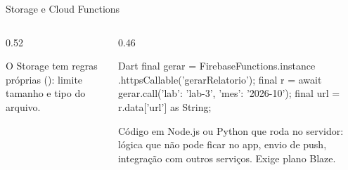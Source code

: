 \documentclass[aspectratio=169,10pt]{beamer}
\begin{document}
\begin{frame}[fragile]{Storage e Cloud Functions}
  \begin{columns}[T]
    \begin{column}{0.52\textwidth}
      \begin{dica}
        O Storage tem regras próprias (): limite tamanho e tipo do arquivo.
      \end{dica}
    \end{column}
    \begin{column}{0.46\textwidth}
\begin{codigo}[title=Chamando uma função]{Dart}
final gerar = FirebaseFunctions.instance
    .httpsCallable('gerarRelatorio');
final r = await gerar.call({'lab': 'lab-3',
    'mes': '2026-10'});
final url = r.data['url'] as String;
\end{codigo}
      \begin{conceito}
        Código em Node.js ou Python que roda no servidor: lógica que não pode ficar no app, envio de push, integração com outros serviços. Exige plano Blaze.
      \end{conceito}
    \end{column}
  \end{columns}
\end{frame}
\end{document}

